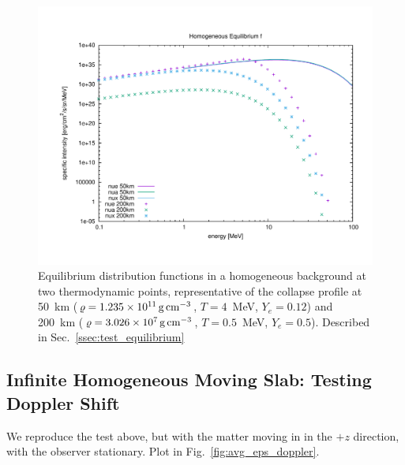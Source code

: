 \documentclass[aps,floatfix,prd,superscriptaddress,twocolumn]{revtex4-1}
\newcommand{\todo}[1]{\marginpar{\tiny{\textcolor{red}{#1}}}}
\begin{document}
\begin{figure}
  \includegraphics[width=\columnwidth]{fig-homogeneous_equilibrium}
  \caption{Equilibrium distribution functions in a homogeneous background
    at two thermodynamic points,
    representative of the collapse profile at
    50~km ($\varrho=1.235 \times 10^{11}\,{\rm g}\,{\rm cm}^{-3}$,
    $T=4$~MeV,
    $Y_e=0.12$) and
    200~km ($\varrho=3.026\times 10^{7}\,{\rm g}\,{\rm cm}^{-3}$,
    $T=0.5$~MeV,
    $Y_e=0.5$).
    Described in Sec.~\ref{ssec:test_equilibrium}}
  \label{fig:homogeneous_isotropic}
\end{figure}

\subsection{Infinite Homogeneous Moving Slab:
  Testing Doppler Shift}
\label{ssec:test_doppler}
We reproduce the test above, but with the matter moving in
in the $+z$ direction, with the observer stationary.
Plot in Fig.~\ref{fig:avg_eps_doppler}.
\todo{describe test}
\end{document}
